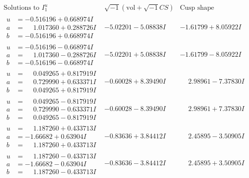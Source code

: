 \documentclass[1p]{elsarticle_modified}
\theoremstyle{definition}
\newcommand{\I}{\sqrt{-1}}
\begin{document}
$$\begin{array}{c|c|c}  
\text{Solutions to }I^u_{1}& \I (\text{vol} + \sqrt{-1}CS) & \text{Cusp shape}\\
 \hline 
\begin{aligned}
u &= -0.516196 + 0.668974 I \\
a &= \phantom{-}1.017360 + 0.288726 I \\
b &= -0.516196 + 0.668974 I\end{aligned}
 & -5.02201 - 5.08838 I & -1.61799 + 8.05922 I \\ \hline\begin{aligned}
u &= -0.516196 - 0.668974 I \\
a &= \phantom{-}1.017360 - 0.288726 I \\
b &= -0.516196 - 0.668974 I\end{aligned}
 & -5.02201 + 5.08838 I & -1.61799 - 8.05922 I \\ \hline\begin{aligned}
u &= \phantom{-}0.049265 + 0.817919 I \\
a &= \phantom{-}0.729990 + 0.633371 I \\
b &= \phantom{-}0.049265 + 0.817919 I\end{aligned}
 & -0.60028 + 8.39490 I & \phantom{-}2.98961 - 7.37830 I \\ \hline\begin{aligned}
u &= \phantom{-}0.049265 - 0.817919 I \\
a &= \phantom{-}0.729990 - 0.633371 I \\
b &= \phantom{-}0.049265 - 0.817919 I\end{aligned}
 & -0.60028 - 8.39490 I & \phantom{-}2.98961 + 7.37830 I \\ \hline\begin{aligned}
u &= \phantom{-}1.187260 + 0.433713 I \\
a &= -1.66682 + 0.63904 I \\
b &= \phantom{-}1.187260 + 0.433713 I\end{aligned}
 & -0.83636 + 3.84412 I & \phantom{-}2.45895 - 3.50905 I \\ \hline\begin{aligned}
u &= \phantom{-}1.187260 - 0.433713 I \\
a &= -1.66682 - 0.63904 I \\
b &= \phantom{-}1.187260 - 0.433713 I\end{aligned}
 & -0.83636 - 3.84412 I & \phantom{-}2.45895 + 3.50905 I \\ \hline\begin{aligned}

\end{aligned}
\end{array}$$
\end{document}
